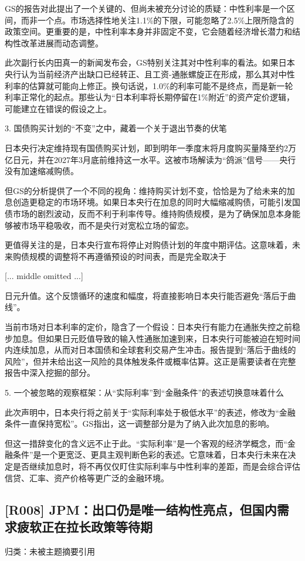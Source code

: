 \documentclass[11pt]{ctexart}
\begin{document}
GS的报告对此提出了一个关键的、但尚未被充分讨论的质疑：中性利率是一个区间，而非一个点。市场选择性地关注1.1\%的下限，可能忽略了2.5\%上限所隐含的政策空间。更重要的是，中性利率本身并非固定不变，它会随着经济增长潜力和结构性改革进展而动态调整。

此次副行长内田真一的新闻发布会，GS特别关注其对中性利率的看法。如果日本央行认为当前经济产出缺口已经转正、且工资-通胀螺旋正在形成，那么其对中性利率的估算就可能向上修正。换句话说，1.0\%的利率可能不是终点，而是新一轮利率正常化的起点。那些认为“日本利率将长期停留在1\%附近”的资产定价逻辑，可能建立在错误的假设之上。

3. 国债购买计划的“不变”之中，藏着一个关于退出节奏的伏笔

日本央行决定维持现有国债购买计划，即到明年一季度末将月度购买量降至约2万亿日元，并在2027年3月底前维持这一水平。这被市场解读为“鸽派”信号——央行没有加速缩减购债。

但GS的分析提供了一个不同的视角：维持购买计划不变，恰恰是为了给未来的加息创造更稳定的市场环境。如果日本央行在加息的同时大幅缩减购债，可能引发国债市场的剧烈波动，反而不利于利率传导。维持购债规模，是为了确保加息本身能够被市场平稳吸收，而不是央行对宽松立场的留恋。

更值得关注的是，日本央行宣布将停止对购债计划的年度中期评估。这意味着，未来购债规模的调整将不再遵循预设的时间表，而是完全取决于

[... middle omitted ...]

日元升值。这个反馈循环的速度和幅度，将直接影响日本央行能否避免“落后于曲线”。

当前市场对日本利率的定价，隐含了一个假设：日本央行有能力在通胀失控之前稳步加息。但如果日元贬值导致的输入性通胀加速到来，日本央行可能被迫在短时间内连续加息，从而对日本国债和全球套利交易产生冲击。报告提到“落后于曲线的风险”，但并未给出这一风险的具体触发条件或概率估算。这正是需要读者在完整报告中深入挖掘的部分。

5. 一个被忽略的观察框架：从“实际利率”到“金融条件”的表述切换意味着什么

此次声明中，日本央行将之前关于“实际利率处于极低水平”的表述，修改为“金融条件一直保持宽松”。GS指出，这一调整部分是为了纳入此次加息的影响。

但这一措辞变化的含义远不止于此。“实际利率”是一个客观的经济学概念，而“金融条件”是一个更宽泛、更具主观判断色彩的表述。它意味着，日本央行未来在决定是否继续加息时，将不再仅仅盯住实际利率与中性利率的差距，而是会综合评估信贷、汇率、资产价格等更广泛的金融环境。

\subsection{[R008] JPM：出口仍是唯一结构性亮点，但国内需求疲软正在拉长政策等待期}
{\small\color{refgray}归类：未被主题摘要引用}
\end{document}
